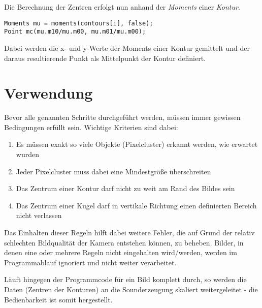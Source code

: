 \documentclass[12pt]{article}
\begin{document}
Die Berechnung der Zentren erfolgt nun anhand der \emph{Moments} einer \emph{Kontur}.
\begin{lstlisting}
Moments mu = moments(contours[i], false);
Point mc(mu.m10/mu.m00, mu.m01/mu.m00);
\end{lstlisting}
Dabei werden die x- und y-Werte der Moments einer Kontur gemittelt und der daraus resultierende Punkt als Mittelpunkt der Kontur definiert.
\section{Verwendung}
Bevor alle genannten Schritte durchgeführt werden, müssen immer gewissen Bedingungen erfüllt sein. Wichtige Kriterien sind dabei:
\begin{enumerate}
\item Es müssen exakt so viele Objekte (Pixelcluster) erkannt werden, wie erwartet wurden
\item Jeder Pixelcluster muss dabei eine Mindestgröße überschreiten
\item Das Zentrum einer Kontur darf nicht zu weit am Rand des Bildes sein
\item Das Zentrum einer Kugel darf in vertikale Richtung einen definierten Bereich nicht verlassen
\end{enumerate}
Das Einhalten dieser Regeln hilft dabei weitere Fehler, die auf Grund der relativ schlechten Bildqualität der Kamera entstehen können, zu beheben. Bilder, in denen eine oder mehrere Regeln nicht eingehalten wird/werden, werden im Programmablauf ignoriert und nicht weiter verarbeitet.

Läuft hingegen der Programmcode für ein Bild komplett durch, so werden die Daten (Zentren der Konturen) an die Sounderzeugung skaliert weitergeleitet - die Bedienbarkeit ist somit hergestellt.
\iffalse
\begin{enumerate}
\item Hole Inputimage von Kamera
\item Konvertieren des Bildes in den HSV-Farbraum für bessere Thresholds
\item Anwendung von medianBlur, um Rauschen aus dem Ausgangsbild zu entfernen
\item Maskieren des Bildes über Thresholds
\item Anwendung von medianBlur, um Rauschen aus dem maskierten Bild zu entfernen
\item Anwendung von errode und dillate, um weiteres (weißes) Rauschen zu entfernen und um Objekte zu schließen
\item Finden der Konturen durch findContours
\item Anhand der Größe der Rückgabe erkennen, ob die korrekte Anzahl an Objekten mit der gewünschten Größe gefunden werden
\item Ist dies der Fall, Berechnung der Zentren der Objekte über moments
\end{enumerate}
\fi
\end{document}
